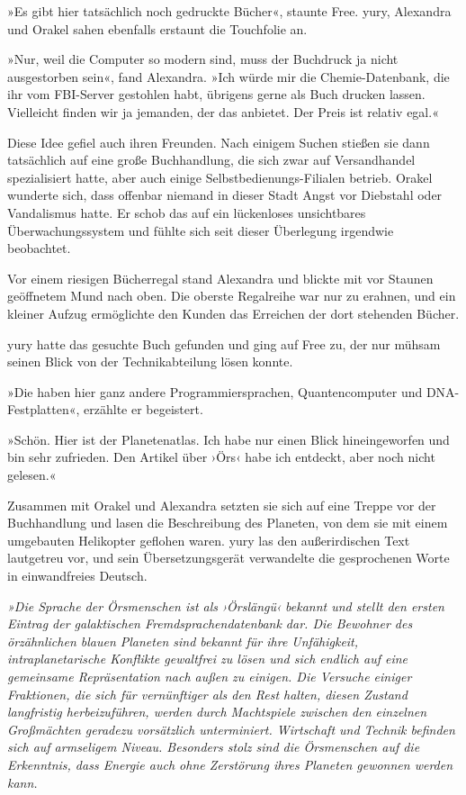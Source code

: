 »Es gibt hier tatsächlich noch gedruckte Bücher«, staunte Free. yury, Alexandra und Orakel sahen ebenfalls erstaunt die Touchfolie an.

»Nur, weil die Computer so modern sind, muss der Buchdruck ja nicht ausgestorben sein«, fand Alexandra. »Ich würde mir die Chemie-Datenbank, die ihr vom FBI-Server gestohlen habt, übrigens gerne als Buch drucken lassen. Vielleicht finden wir ja jemanden, der das anbietet. Der Preis ist relativ egal.«

Diese Idee gefiel auch ihren Freunden. Nach einigem Suchen stießen sie dann tatsächlich auf eine große Buchhandlung, die sich zwar auf Versandhandel spezialisiert hatte, aber auch einige Selbstbedienungs-Filialen betrieb. Orakel wunderte sich, dass offenbar niemand in dieser Stadt Angst vor Diebstahl oder Vandalismus hatte. Er schob das auf ein lückenloses unsichtbares Überwachungssystem und fühlte sich seit dieser Überlegung irgendwie beobachtet.

Vor einem riesigen Bücherregal stand Alexandra und blickte mit vor Staunen geöffnetem Mund nach oben. Die oberste Regalreihe war nur zu erahnen, und ein kleiner Aufzug ermöglichte den Kunden das Erreichen der dort stehenden Bücher.

yury hatte das gesuchte Buch gefunden und ging auf Free zu, der nur mühsam seinen Blick von der Technikabteilung lösen konnte.

»Die haben hier ganz andere Programmiersprachen, Quantencomputer und DNA-Festplatten«, erzählte er begeistert.

»Schön. Hier ist der Planetenatlas. Ich habe nur einen Blick hineingeworfen und bin sehr zufrieden. Den Artikel über ›Örs‹ habe ich entdeckt, aber noch nicht gelesen.«

Zusammen mit Orakel und Alexandra setzten sie sich auf eine Treppe vor der Buchhandlung und lasen die Beschreibung des Planeten, von dem sie mit einem umgebauten Helikopter geflohen waren. yury las den außerirdischen Text lautgetreu vor, und sein Übersetzungsgerät verwandelte die gesprochenen Worte in einwandfreies Deutsch.

\textit{»Die Sprache der Örsmenschen ist als ›Örslängü‹ bekannt und stellt den ersten Eintrag der galaktischen Fremdsprachendatenbank dar. Die Bewohner des örzähnlichen blauen Planeten sind bekannt für ihre Unfähigkeit, intraplanetarische Konflikte gewaltfrei zu lösen und sich endlich auf eine gemeinsame Repräsentation nach außen zu einigen. Die Versuche einiger Fraktionen, die sich für vernünftiger als den Rest halten, diesen Zustand langfristig herbeizuführen, werden durch Machtspiele zwischen den einzelnen Großmächten geradezu vorsätzlich unterminiert. Wirtschaft und Technik befinden sich auf armseligem Niveau. Besonders stolz sind die Örsmenschen auf die Erkenntnis, dass Energie auch ohne Zerstörung ihres Planeten gewonnen werden kann.}


